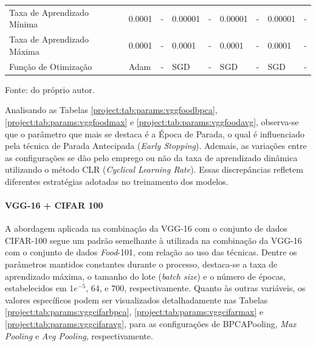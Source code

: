 \begin{table}[H]
{\begin{tabular}{l|l|l|l|l|l|l|l|l}
            Taxa de Aprendizado Mínima                   & 0.0001                             & -                       & 0.00001                            & -                       & 0.00001                            & -                       & 0.00001                            & -                                                                  \\
            Taxa de Aprendizado Máxima                   & 0.0001                             & -                       & 0.0001                             & -                       & 0.0001                             & -                       & 0.0001                             & -                                                                  \\
            Função de Otimização                         & Adam                               & -                       & SGD                                & -                       & SGD                                & -                       & SGD                                & -                       
        \end{tabular}
        }

    \vspace*{1 cm}
    Fonte: do próprio autor.
\end{table}

Analisando as Tabelas \ref{project:tab:params:vggfoodbpca}, \ref{project:tab:params:vggfoodmax} e \ref{project:tab:params:vggfoodavg}, observa-se que o parâmetro que mais se destaca é a Época de Parada, o qual é influenciado pela técnica de Parada Antecipada (\textit{Early Stopping}). Ademais, as variações entre as configurações se dão pelo emprego ou não da taxa de aprendizado dinâmica utilizando o método CLR (\textit{Cyclical Learning Rate}). Essas discrepâncias refletem diferentes estratégias adotadas no treinamento dos modelos.

\paragraph{VGG-16 + CIFAR 100}
\label{params:vggcifar}
A abordagem aplicada na combinação da VGG-16 com o conjunto de dados CIFAR-100 segue um padrão semelhante à utilizada na combinação da VGG-16 com o conjunto de dados \textit{Food}-101, com relação ao uso das técnicas. Dentre os parâmetros mantidos constantes durante o processo, destaca-se a taxa de aprendizado máxima, o tamanho do lote (\textit{batch size}) e o número de épocas, estabelecidos em $1e^{-5}$, $64$, e $700$, respectivamente. Quanto às outras variáveis, os valores específicos podem ser visualizados detalhadamente nas Tabelas \ref{project:tab:params:vggcifarbpca}, \ref{project:tab:params:vggcifarmax} e \ref{project:tab:params:vggcifaravg}, para as configurações de BPCAPooling, \textit{Max Pooling} e \textit{Avg Pooling}, respectivamente.


